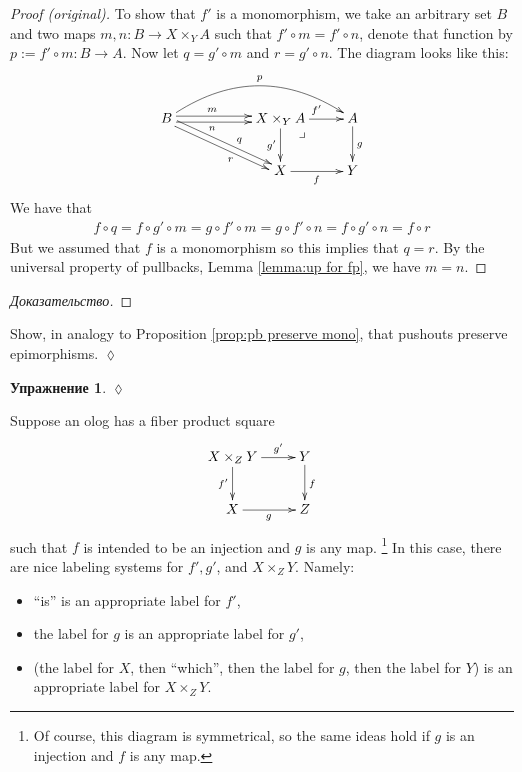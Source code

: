 \documentclass[a4paper]{book}
\makeatletter
\def\to{\rightarrow}
\def\taking{\colon}
\def\ullimit{\ar@{}[rd]|(.3)*+{\lrcorner}}
\theoremstyle{myth}
\newtheorem{exampleENG}[envENG]{\begin{english}Example\end{english}}
\newtheorem{excENG}[envENG]{\begin{english}Exercise\end{english}}
\newenvironment{proofENG}{\begin{proof}[Proof (original)]}{\end{proof}}
\newenvironment{exerciseENG}{\begin{excENG}}{\hspace*{\fill}$\lozenge$\end{excENG}}
\newtheorem{excRUS}[envRUS]{Упражнение}
\newenvironment{proofRUS}{\begin{proof}[Доказательство]}{\end{proof}}
\newenvironment{exerciseRUS}{\begin{excRUS}}{\hspace*{\fill}$\lozenge$\end{excRUS}}
\makeatother
\begin{document}
\begin{russian}
\begin{proofENG}
To show that $f'$ is a monomorphism, we take an arbitrary set $B$ and two maps $m,n\taking B\to X\times_YA$ such that $f'\circ m=f'\circ n$, denote that function by $p:=f'\circ m\taking B\to A$. Now let $q=g'\circ m$ and $r=g'\circ n$. The diagram looks like this:
$$
\xymatrix{B\ar@<.5ex>[rr]^(.4)m\ar@<-.5ex>[rr]_(.4)n\ar@/^2pc/[rrr]^p\ar@<.5ex>[drr]^(.6)q\ar@<-.5ex>[drr]_(.6)r&&X\times_YA\ar[r]^{f'}\ar[d]_{g'}\ullimit&A\ar[d]^g\\&&X\ar[r]_f&Y}
$$
We have that 
\begin{align*}f\circ q=f\circ g'\circ m=g\circ f'\circ m=g\circ f'\circ n=f\circ g'\circ n=f\circ r\end{align*} 
But we assumed that $f$ is a monomorphism so this implies that $q=r$. By the universal property of pullbacks, Lemma \ref{lemma:up for fp}, we have $m=n$.
\end{proofENG}

\begin{proofRUS}
 
\end{proofRUS}

\begin{exerciseENG}
Show, in analogy to Proposition \ref{prop:pb preserve mono}, that pushouts preserve epimorphisms.
\end{exerciseENG}

\begin{exerciseRUS}
 
\end{exerciseRUS}

\begin{exampleENG}\label{exc:olog pullbacks}
Suppose an olog has a fiber product square
$$\xymatrix{X\times_ZY\ar[r]^-{g'}\ar[d]_{f'}&Y\ar[d]^f\\X\ar[r]_g&Z}$$ such that $f$ is intended to be an injection and $g$ is any map.%
\footnote{Of course, this diagram is symmetrical, so the same ideas hold if $g$ is an injection and $f$ is any map.} 
In this case, there are nice labeling systems for $f', g'$, and $X\times_ZY$. Namely:
\begin{itemize}
\item “is” is an appropriate label for $f'$, 
\item the label for $g$ is an appropriate label for $g'$,
\item (the label for $X$, then “which”, then the label for $g$, then the label for $Y$) is an appropriate label for $X\times_ZY$.
\end{itemize}


\end{exampleENG}
\end{russian}
\end{document}
